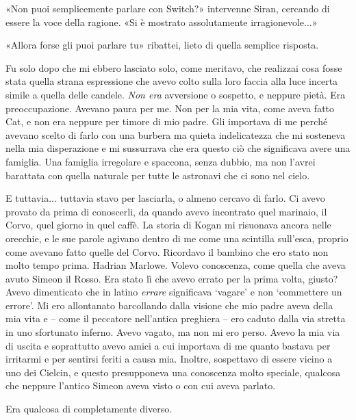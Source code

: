 «Non puoi semplicemente parlare con Switch?» intervenne Siran, cercando
di essere la voce della ragione. «Si è mostrato assolutamente
irragionevole...»

«Allora forse gli puoi parlare tu» ribattei, lieto di quella semplice
risposta.

\begin{figure}
	\centering
	\def\svgwidth{\columnwidth}
	\scalebox{0.2}{}
\end{figure}

Fu solo dopo che mi ebbero lasciato solo, come meritavo, che realizzai
cosa fosse stata quella strana espressione che avevo colto sulla loro
faccia alla luce incerta simile a quella delle candele. \emph{Non era}
avversione o sospetto, e neppure pietà. Era preoccupazione. {Avevano}
paura per me. Non per la mia vita, come aveva fatto Cat, e non era
neppure per timore di mio padre. Gli importava di me perché avevano
scelto di farlo con una burbera ma quieta indelicatezza che mi sosteneva
nella mia disperazione e mi sussurrava che era questo ciò che
significava avere una famiglia. Una famiglia irregolare e spaccona,
senza dubbio, ma non l'avrei barattata con quella naturale per tutte le
astronavi che ci sono nel cielo.

E tuttavia... tuttavia stavo per lasciarla, o almeno cercavo di farlo.
Ci avevo provato da prima di conoscerli, da quando avevo incontrato quel
marinaio, il Corvo, quel giorno in quel caffè. La storia di Kogan mi
risuonava ancora nelle orecchie, e le sue parole agivano dentro di me
come una scintilla sull'esca, proprio come avevano fatto quelle del
Corvo. Ricordavo il bambino che ero stato non molto tempo prima. Hadrian
Marlowe. Volevo conoscenza, come quella che aveva avuto Simeon il Rosso.
Era stato lì che avevo errato per la prima volta, giusto? Avevo
dimenticato che in latino \emph{errare} significava `vagare' e non
`commettere un errore'. Mi ero allontanato barcollando dalla visione che
mio padre aveva della mia vita e -- come il peccatore nell'antica
preghiera -- ero caduto dalla via stretta in uno sfortunato inferno.
Avevo vagato, ma non mi ero perso. Avevo la mia via di uscita e
soprattutto avevo amici a cui importava di me quanto bastava per
irritarmi e per sentirsi feriti a causa mia. Inoltre, sospettavo di
essere vicino a uno dei Cielcin, e questo presupponeva una conoscenza
molto speciale, qualcosa che neppure l'antico Simeon aveva visto o con
cui aveva parlato.

Era qualcosa di completamente diverso.

